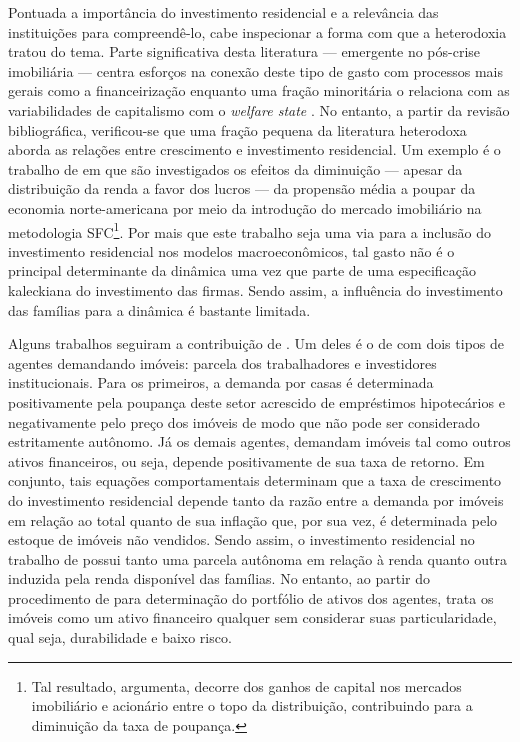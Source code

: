Pontuada a importância do investimento residencial e a relevância das instituições para compreendê-lo, cabe inspecionar a forma com que a heterodoxia tratou do tema. Parte significativa desta literatura  --- emergente no pós-crise imobiliária --- centra esforços na conexão deste tipo de gasto com processos mais gerais como a financeirização \cites{aalbers_financialization_2008}{bibow_financialization_2010}
enquanto uma fração minoritária o relaciona com as variabilidades
de capitalismo com o \textit{welfare state} \cite{schwartz_politics_2009}. No
entanto, a partir da revisão bibliográfica, verificou-se que uma fração pequena da literatura heterodoxa aborda as relações entre crescimento e investimento residencial.
Um  exemplo é o trabalho de \textcite{zezza_u.s._2008} em que são investigados os efeitos da diminuição --- apesar da distribuição da renda a favor dos lucros --- da propensão média a poupar da economia norte-americana por meio da introdução do mercado imobiliário na metodologia SFC\footnote{
	Tal resultado, argumenta, decorre dos ganhos de capital nos mercados imobiliário e acionário entre o topo da distribuição, contribuindo para a diminuição da taxa de poupança.
}. 
Por mais que este trabalho seja uma via para a inclusão do investimento residencial nos modelos macroeconômicos, tal gasto não é o principal determinante da dinâmica  uma vez que parte de uma especificação kaleckiana do investimento das firmas.
Sendo assim, a influência do investimento das famílias para a dinâmica é bastante limitada.

Alguns trabalhos seguiram a contribuição de \textcite{zezza_u.s._2008}.
Um deles é o de \textcite{nikolaidi_securitisation_2015} com dois tipos de agentes demandando imóveis: parcela dos trabalhadores e investidores institucionais.
Para os primeiros, a demanda por casas é determinada positivamente pela poupança deste setor acrescido de empréstimos hipotecários e negativamente pelo preço dos imóveis de modo que não pode ser considerado estritamente autônomo.
Já os demais agentes, demandam imóveis tal como outros ativos financeiros, ou seja, depende positivamente de sua taxa de retorno.
Em conjunto, tais equações comportamentais determinam que a taxa de crescimento do investimento residencial depende tanto da razão entre a demanda por imóveis em relação ao total quanto de sua inflação que, por sua vez, é determinada pelo estoque de imóveis não vendidos.
Sendo assim, o investimento residencial no trabalho de \textcite{nikolaidi_securitisation_2015} possui tanto uma parcela autônoma em relação à renda quanto outra induzida pela renda disponível das famílias.
No entanto, ao partir do procedimento de \textcite{godley_money_1999} para determinação do portfólio de ativos dos agentes, trata os imóveis como um ativo financeiro qualquer sem considerar suas particularidade, qual seja, durabilidade e baixo risco. %

